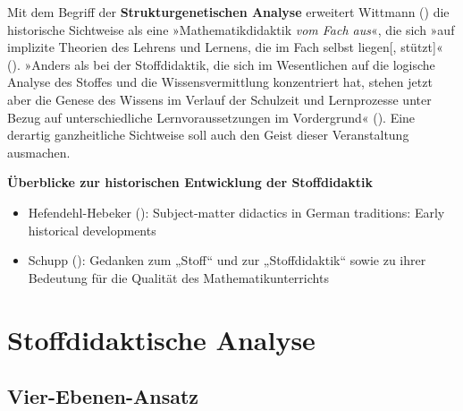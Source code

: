 \documentclass[
]{scrbook}
\providecommand{\tightlist}{%
  \setlength{\itemsep}{0pt}\setlength{\parskip}{0pt}}
\renewenvironment{quote}{
  \list{}{
	\leftmargin0.2cm   %
    \rightmargin\leftmargin
      	\def\FrameCommand
    {%
        {\color{quoteColor}\vrule width 2pt}%
        \hspace{0pt}%
    }%
    \MakeFramed{\advance \hsize -\width \FrameRestore}    \color{quoteColor}
    }
  \item\relax
}
{\endlist\color{black}\endMakeFramed}
\theoremstyle{definition}
\theoremstyle{definition}
\theoremstyle{definition}
\theoremstyle{definition}
\theoremstyle{remark}
\begin{document}
Mit dem Begriff der \textbf{Strukturgenetischen Analyse} erweitert Wittmann () die historische Sichtweise als eine »Mathematikdidaktik \emph{vom Fach aus}«, die sich »auf implizite Theorien des Lehrens und Lernens, die im Fach selbst liegen{[}, stützt{]}« (). »Anders als bei der Stoffdidaktik, die sich im Wesentlichen auf die logische Analyse des Stoffes und die Wissensvermittlung konzentriert hat, stehen jetzt aber die Genese des Wissens im Verlauf der Schulzeit und Lernprozesse unter Bezug auf unterschiedliche Lernvoraussetzungen im Vordergrund« (). Eine derartig ganzheitliche Sichtweise soll auch den Geist dieser Veranstaltung ausmachen.

\begin{quote}
\textbf{Überblicke zur historischen Entwicklung der Stoffdidaktik}

\begin{itemize}
\tightlist
\item
  Hefendehl-Hebeker (): Subject-matter didactics in German traditions: Early historical developments
\item
  Schupp (): Gedanken zum „Stoff`` und zur „Stoffdidaktik`` sowie zu ihrer Bedeutung für die Qualität des Mathematikunterrichts
\end{itemize}
\end{quote}

\part*{Stoffdidaktische Analyse}\label{part-stoffdidaktische-analyse}

\chapter{Vier-Ebenen-Ansatz}\label{vier-ebenen-ansatz}
\end{document}
